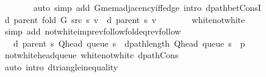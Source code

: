 \begin{isabellebody}
\ \ \ \ \ \ \isamarkupfalse%
\ {\isacharparenleft}{\kern0pt}auto\ simp\ add{\isacharcolon}{\kern0pt}\ G{\isachardot}{\kern0pt}mem{\isacharunderscore}{\kern0pt}adjacency{\isacharunderscore}{\kern0pt}iff{\isacharunderscore}{\kern0pt}edge\ intro{\isacharcolon}{\kern0pt}\ dpath{\isacharunderscore}{\kern0pt}bet{\isacharunderscore}{\kern0pt}ConsI{\isacharparenright}{\kern0pt}\isanewline
\ \ \ \ \isamarkupfalse%
\ {\isachardoublequoteopen}d\ {\isacharparenleft}{\kern0pt}parent\ {\isacharparenleft}{\kern0pt}fold\ G\ src\ s{\isacharparenright}{\kern0pt}{\isacharparenright}{\kern0pt}\ v\ {\isacharequal}{\kern0pt}\ d\ {\isacharparenleft}{\kern0pt}parent\ s{\isacharparenright}{\kern0pt}\ v{\isachardoublequoteclose}\isanewline
\ \ \ \ \ \ \isamarkupfalse%
\ white{\isacharunderscore}{\kern0pt}not{\isacharunderscore}{\kern0pt}white\isanewline
\ \ \ \ \ \ \isamarkupfalse%
\ {\isacharparenleft}{\kern0pt}simp\ add{\isacharcolon}{\kern0pt}\ not{\isacharunderscore}{\kern0pt}white{\isacharunderscore}{\kern0pt}imp{\isacharunderscore}{\kern0pt}rev{\isacharunderscore}{\kern0pt}follow{\isacharunderscore}{\kern0pt}fold{\isacharunderscore}{\kern0pt}eq{\isacharunderscore}{\kern0pt}rev{\isacharunderscore}{\kern0pt}follow{\isacharparenright}{\kern0pt}\isanewline
\ \ \ \ \isamarkupfalse%
\ \isamarkupfalse%
\ {\isachardoublequoteopen}{\isachardot}{\kern0pt}{\isachardot}{\kern0pt}{\isachardot}{\kern0pt}\ {\isasymle}\ d\ {\isacharparenleft}{\kern0pt}parent\ s{\isacharparenright}{\kern0pt}\ {\isacharparenleft}{\kern0pt}Q{\isacharunderscore}{\kern0pt}head\ {\isacharparenleft}{\kern0pt}queue\ s{\isacharparenright}{\kern0pt}{\isacharparenright}{\kern0pt}\ {\isacharplus}{\kern0pt}\ dpath{\isacharunderscore}{\kern0pt}length\ {\isacharparenleft}{\kern0pt}Q{\isacharunderscore}{\kern0pt}head\ {\isacharparenleft}{\kern0pt}queue\ s{\isacharparenright}{\kern0pt}\ {\isacharhash}{\kern0pt}\ p{\isacharparenright}{\kern0pt}{\isachardoublequoteclose}\isanewline
\ \ \ \ \ \ \isamarkupfalse%
\ not{\isacharunderscore}{\kern0pt}white{\isacharunderscore}{\kern0pt}head{\isacharunderscore}{\kern0pt}queue\ white{\isacharunderscore}{\kern0pt}not{\isacharunderscore}{\kern0pt}white\ dpath{\isacharunderscore}{\kern0pt}Cons\isanewline
\ \ \ \ \ \ \isamarkupfalse%
\ {\isacharparenleft}{\kern0pt}auto\ intro{\isacharcolon}{\kern0pt}\ d{\isacharunderscore}{\kern0pt}triangle{\isacharunderscore}{\kern0pt}inequality{\isacharparenright}{\kern0pt}\isanewline
\ \ \ \ \isamarkupfalse%

\end{isabellebody}
